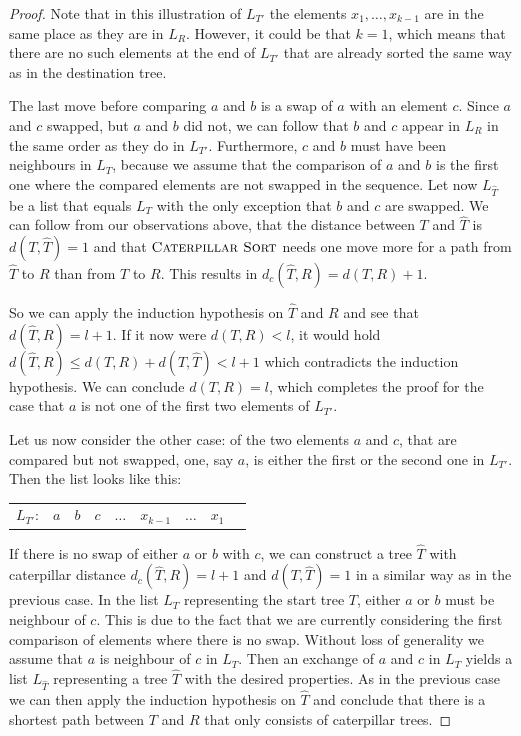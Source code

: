 \documentclass{amsart}
\newcommand{\csort}{\textsc{Caterpillar Sort}}
\begin{document}
\begin{proof}
Note that in this illustration of $L_{T'}$ the elements $x_1, \ldots, x_{k-1}$ are in the same place as they are in $L_R$.
However, it could be that $k=1$, which means that there are no such elements at the end of $L_{T'}$ that are already sorted the same way as in the destination tree.

The last move before comparing $a$ and $b$ is a swap of $a$ with an element $c$.
Since $a$ and $c$ swapped, but $a$ and $b$ did not, we can follow that $b$ and $c$ appear in $L_R$ in the same order as they do in $L_{T'}$.
Furthermore, $c$ and $b$ must have been neighbours in $L_T$, because we assume that the comparison of $a$ and $b$ is the first one where the compared elements are not swapped in the sequence.
Let now $L_{\hat T}$ be a list that equals $L_T$ with the only exception that $b$ and $c$ are swapped.
We can follow from our observations above, that the distance between $T$ and $\hat T$ is $d(T, \hat T) = 1$ and that $\csort$ needs one move more for a path from $\hat T$ to $R$ than from $T$ to $R$.
This results in $d_c(\hat T, R) = d(T,R) + 1$.

So we can apply the induction hypothesis on $\hat T$ and $R$ and see that $d(\hat T,R) = l+1$.
If it now were $d(T,R) < l$, it would hold $d(\hat T,R) \leq d(T,R) + d(T,\hat T) < l + 1$ which contradicts the induction hypothesis.
We can conclude $d(T,R) = l$, which completes the proof for the case that $a$ is not one of the first two elements of $L_{T'}$.

Let us now consider the other case:
of the two elements $a$ and $c$, that are compared but not swapped, one, say $a$, is either the first or the second one in $L_{T'}$.
Then the list looks like this:

\vspace{12pt}
\begin{tabular}{c|c|c|c|c|c|c|c|c|}
\cline{2-8}
$L_{T'}$: & $a$ & $b$ & $c$ & $\ldots$ & $x_{k-1}$ & $\ldots$ & $x_1$\\
\cline{2-8}
\end{tabular}
\vspace{12pt}

If there is no swap of either $a$ or $b$ with $c$, we can construct a tree $\hat T$ with caterpillar distance $d_c(\hat T, R) = l+1$ and $d(T,\hat T) = 1$ in a similar way as in the previous case.
In the list $L_T$ representing the start tree $T$, either $a$ or $b$ must be neighbour of $c$.
This is due to the fact that we are currently considering the first comparison of elements where there is no swap.
Without loss of generality we assume that $a$ is neighbour of $c$ in $L_T$.
Then an exchange of $a$ and $c$ in $L_T$ yields a list $L_{\hat T}$ representing a tree $\hat T$ with the desired properties.
As in the previous case we can then apply the induction hypothesis on $\hat T$ and conclude that there is a shortest path between $T$ and $R$ that only consists of caterpillar trees.
\end{proof}
\end{document}
